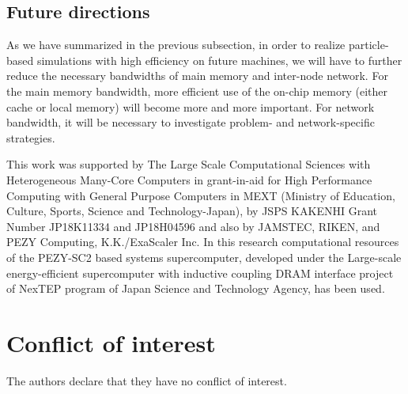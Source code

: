 \subsection{Future directions}

As we have summarized in the previous subsection, in order to realize 
particle-based simulations with high efficiency  on future machines,
we will have to further reduce the necessary bandwidths of main memory
and inter-node network. For the main memory bandwidth,
more efficient use of the on-chip memory (either cache or local
memory) will become more and more important. For network bandwidth,
it will be necessary to investigate  problem- and network-specific
strategies. 










\begin{acknowledgements}
This work was supported by The Large Scale Computational Sciences with
Heterogeneous Many-Core Computers in grant-in-aid for High Performance
Computing with General Purpose Computers in MEXT (Ministry of
Education, Culture, Sports, Science and Technology-Japan), by JSPS
KAKENHI Grant Number JP18K11334 and JP18H04596 and also by JAMSTEC,
RIKEN, and PEZY Computing, K.K./ExaScaler Inc. In this research
computational resources of the PEZY-SC2 based systems supercomputer,
developed under the Large-scale energy-efficient supercomputer with
inductive coupling DRAM interface project of NexTEP program of Japan
Science and Technology Agency, has been used.

\end{acknowledgements}


%
\section*{Conflict of interest}
The authors declare that they have no conflict of interest.


